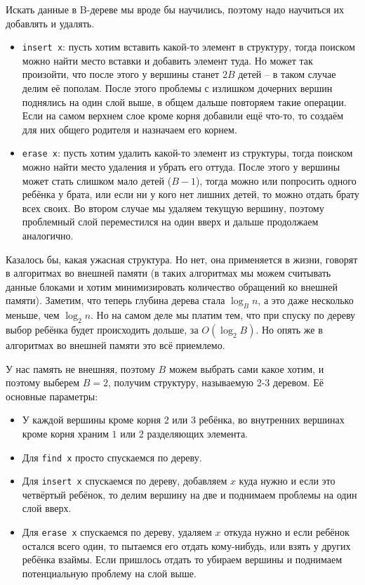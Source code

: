 Искать данные в B-дереве мы вроде бы научились, поэтому надо научиться их добавлять и удалять.
\begin{itemize}
    \item \texttt{insert x}: пусть хотим вставить какой-то элемент в структуру, тогда поиском можно найти место вставки и добавить элемент туда. Но может так произойти, что после этого у вершины станет $2B$ детей -- в таком случае делим её пополам. После этого проблемы с излишком дочерних вершин поднялись на один слой выше, в общем дальше повторяем такие операции. Если на самом верхнем слое кроме корня добавили ещё что-то, то создаём для них общего родителя и назначаем его корнем.
    \item \texttt{erase x}: пусть хотим удалить какой-то элемент из структуры, тогда поиском можно найти место удаления и убрать его оттуда. После этого у вершины может стать слишком мало детей ($B - 1$), тогда можно или попросить одного ребёнка у брата, или если ни у кого нет лишних детей, то можно отдать брату всех своих. Во втором случае мы удаляем текущую вершину, поэтому проблемный слой переместился на один вверх и дальше продолжаем аналогично.
\end{itemize}

Казалось бы, какая ужасная структура. Но нет, она применяется в жизни, говорят в алгоритмах во внешней памяти (в таких алгоритмах мы можем считывать данные блоками и хотим минимизировать количество обращений ко внешней памяти). Заметим, что теперь глубина дерева стала $\log_B n$, а это даже несколько меньше, чем $\log_2 n$. Но на самом деле мы платим тем, что при спуску по дереву выбор ребёнка будет происходить дольше, за $O(\log_2 B)$. Но опять же в алгоритмах во внешней памяти это всё приемлемо.


У нас память не внешняя, поэтому $B$ можем выбрать сами какое хотим, и поэтому выберем $B=2$, получим структуру, называемую 2-3 деревом. Её основные параметры:
\begin{itemize}
    \item У каждой вершины кроме корня $2$ или $3$ ребёнка, во внутренних вершинах кроме корня храним $1$ или $2$ разделяющих элемента.
    \item Для \texttt{find x} просто спускаемся по дереву.
    \item Для \texttt{insert x} спускаемся по дереву, добавляем $x$ куда нужно и если это четвёртый ребёнок, то делим вершину на две и поднимаем проблемы на один слой вверх.
    \item Для \texttt{erase x} спускаемся по дереву, удаляем $x$ откуда нужно и если ребёнок остался всего один, то пытаемся его отдать кому-нибудь, или взять у других ребёнка взаймы. Если пришлось отдать то убираем вершины и поднимаем потенциальную проблему на слой выше.
\end{itemize}

